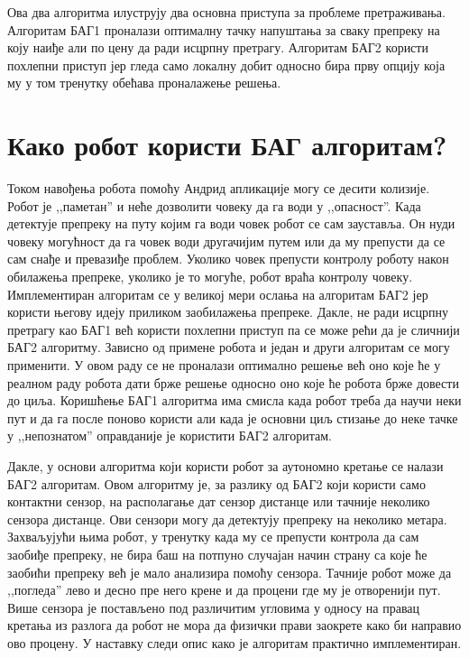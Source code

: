 \documentclass[12pt,oneside]{memoir}
\theoremstyle{remark}
\begin{document}
Ова два алгоритма илуструју два основна приступа за проблеме претраживања. Алгоритам БАГ1 проналази оптималну тачку напуштања за сваку препреку на коју наиђе али по цену да ради исцрпну претрагу. Алгоритам БАГ2 користи похлепни приступ јер гледа само локалну добит односно бира прву опцију која му у том тренутку обећава проналажење решења.

\section{Како робот користи БАГ алгоритам?}
Током навођења робота помоћу Андрид апликације могу се десити колизије. Робот је ,,паметан'' и неће дозволити човеку да га води у ,,опасност''. Када детектује препреку на путу којим га води човек робот се сам зауставља. Он нуди човеку могућност да га човек води другачијим путем или да му препусти да се сам снађе и превазиђе проблем. Уколико човек препусти контролу роботу након обилажења препреке, уколико је то могуће, робот враћа контролу човеку. Имплементиран алгоритам се у великој мери ослања на алгоритам  БАГ2 јер користи његову идеју приликом заобилажења препреке. Дакле, не ради исцрпну претрагу као БАГ1 већ користи похлепни приступ па се може рећи да је сличнији БАГ2 алгоритму. Зависно од примене робота и један и други алгоритам се могу применити. У овом раду се не проналази оптимално решење већ оно које ће у реалном раду робота дати брже решење односно оно које ће робота брже довести до циља. Коришћење БАГ1 алгоритма има смисла када робот треба да научи неки пут и да га после поново користи али када је основни циљ стизање до неке тачке у ,,непознатом'' оправданије је користити БАГ2 алгоритам.

Дакле, у основи алгоритма који користи робот за аутономно кретање се налази БАГ2 алгоритам. Овом алгоритму је, за разлику од БАГ2 који користи само контактни сензор, на располагање дат сензор дистанце или тачније неколико сензора дистанце. Ови сензори могу да детектују препреку на неколико метара. Захваљујући њима робот, у тренутку када му се препусти контрола да сам заобиђе препреку, не бира баш на потпуно случајан начин страну са које ће заобићи препреку већ је мало анализира помоћу сензора. Тачније робот може да ,,погледа'' лево и десно пре него крене и да процени где му је отворенији пут. Више сензора је постављено под различитим угловима у односу на правац кретања из разлога да робот не мора да физички прави заокрете како би направио ово процену. У наставку следи опис како је алгоритам практично имплементиран.
\end{document}
